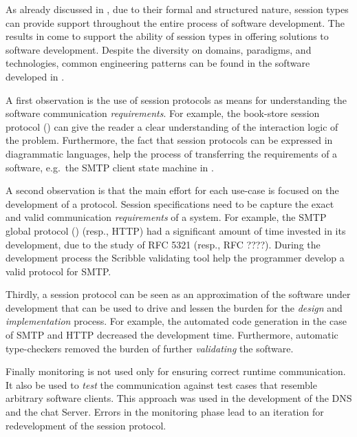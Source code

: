 
As already discussed in ,
due to their formal and structured nature,
session types can provide support throughout the
entire process of software development.
The results in  come to support
the ability of session types in offering solutions
to software development.
%
Despite the diversity on domains, paradigms,
and technologies, common engineering patterns
can be found in the software developed in .

A first observation is the use of session protocols
as means for understanding the software communication
{\em requirements}. For example, the book-store
session protocol () can give
the reader a clear understanding of the interaction logic of
the problem. Furthermore, the fact that session protocols
can be expressed in diagrammatic languages, help
the process of transferring the requirements of a software,
e.g.~the SMTP client state machine in .

A second observation is that the main effort for each use-case
is focused on the development of a protocol.
Session specifications need to be capture the exact
and valid communication {\em requirements} of a system.
For example, the SMTP global protocol () (resp., HTTP)
had a significant amount of time invested in its development,
due to the study of RFC 5321 (resp., RFC ????).
During the development process the Scribble validating tool
help the programmer develop a valid protocol for SMTP.

Thirdly, a session protocol can be seen as an approximation
of the software under development that can be used to drive
and lessen the burden for the {\em design} and {\em implementation} process.
For example, the automated code generation in the case of
SMTP and HTTP decreased the development time. Furthermore,
automatic type-checkers removed the burden of further
{\em validating} the software.

Finally monitoring is not used only for ensuring
correct runtime communication.
It also be used to {\em test} the communication
against test cases that resemble arbitrary software clients.
This approach was used in the development of the DNS and
the chat Server. Errors in the monitoring phase
lead to an iteration for redevelopment of the session protocol.

